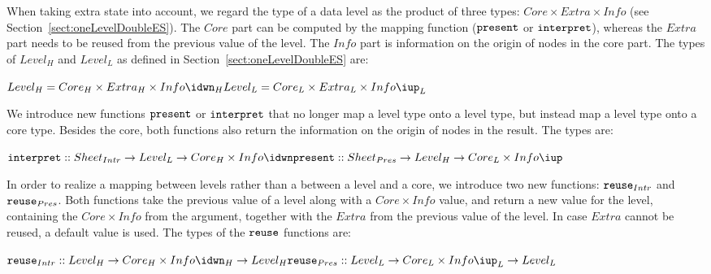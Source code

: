 When taking extra state into account, we regard the type of a data level as the product of three types: 
$Core \times Extra \times Info$ (see Section~\ref{sect:oneLevelDoubleES}). The $Core$ part can be computed by the mapping function (${\tt present}$ or ${\tt interpret}$), whereas the $Extra$ part needs to be reused from the previous value of the level. The $Info$ part is information on the origin of nodes in the core part. The types of $Level_{H}$ and $Level_{L}$ as defined in Section~\ref{sect:oneLevelDoubleES} are: 

\begin{small}\begin{math} 
Level_{H} = Core_{H} \times Extra_{H} \times Info\idwn_{H}\\
Level_{L} = Core_{L} \times Extra_{L} \times Info\iup_{L}\\
\end{math}\end{small}

We introduce new functions ${\tt present}$ or ${\tt interpret}$ that no longer map a level type onto a level type, but instead map a level type onto a core type. Besides the core, both functions also return the information on the origin of nodes in the result. The types are:

\begin{small}\begin{math}
{\tt interpret} :: Sheet_{Intr} \rightarrow Level_{L} \rightarrow Core_{H}\times Info\idwn\\
{\tt present} :: Sheet_{Pres} \rightarrow  Level_{H} \rightarrow Core_{L}\times Info\iup\\
\end{math}\end{small}

In order to realize a mapping between levels rather than a between a level and a core, we introduce two new functions: ${\tt reuse}_{Intr}$  and ${\tt reuse}_{Pres}$. Both functions take the previous value of a level along with a $Core \times Info$ value, and return a new value for the level, containing the $Core \times Info$ from the argument, together with the $Extra$ from the previous value of the level. In case $Extra$  cannot be reused, a default value is used. The types of the ${\tt reuse}$ functions are:

\begin{small}\begin{math}
{\tt reuse}_{Intr} ::  Level_{H} \rightarrow Core_{H} \times Info\idwn_{H} \rightarrow Level_{H}\\
{\tt reuse}_{Pres} ::  Level_{L}  \rightarrow Core_{L} \times Info\iup_{L}    \rightarrow Level_{L}\\
\end{math}\end{small} 

